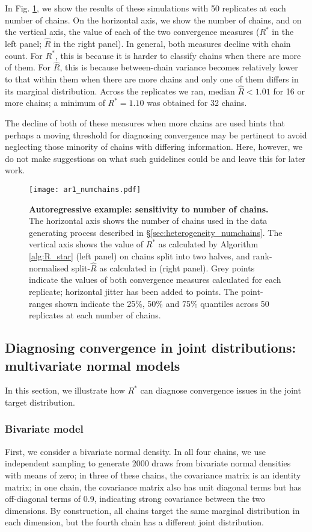 \documentclass{article}
\begin{document}
In Fig. \ref{fig:ar1_numchains}, we show the results of these simulations with 50 replicates at each number of chains. On the horizontal axis, we show the number of chains, and on the vertical axis, the value of each of the two convergence measures ($R^*$ in the left panel; $\widehat{R}$ in the right panel). In general, both measures decline with chain count. For $R^*$, this is because it is harder to classify chains when there are more of them. For $\widehat{R}$, this is because between-chain variance becomes relatively lower to that within them when there are more chains and only one of them differs in its marginal distribution. Across the replicates we ran, median $\widehat{R}<1.01$ for 16 or more chains; a minimum of $R^*=1.10$ was obtained for 32 chains.

The decline of both of these measures when more chains are used hints that perhaps a moving threshold for diagnosing convergence may be pertinent to avoid neglecting those minority of chains with differing information. Here, however, we do not make suggestions on what such guidelines could be and leave this for later work.

\begin{figure}[!htb]
	\centerline{\texttt{[image: ar1\_numchains.pdf]}}
	\caption{\textbf{Autoregressive example: sensitivity to number of chains.} The horizontal axis shows the number of chains used in the data generating process described in \S\ref{sec:heterogeneity_numchains}. The vertical axis shows the value of $R^*$ as calculated by Algorithm \ref{alg:R_star} (left panel) on chains split into two halves, and rank-normalised split-$\widehat{R}$ as calculated in \cite{vehtari2019rank} (right panel). Grey points indicate the values of both convergence measures calculated for each replicate; horizontal jitter has been added to points. The point-ranges shown indicate the 25\%, 50\% and 75\% quantiles across 50 replicates at each number of chains.}
	\label{fig:ar1_numchains}
\end{figure}

\subsection{Diagnosing convergence in joint distributions: multivariate normal models}\label{sec:multivariate_normal}
In this section, we illustrate how $R^*$ can diagnose convergence issues in the joint target distribution.

\subsubsection{Bivariate model}\label{sec:multivariate_normal_bivariate}
First, we consider a bivariate normal density. In all four chains, we use independent sampling to generate 2000 draws from bivariate normal densities with means of zero; in three of these chains, the covariance matrix is an identity matrix; in one chain, the covariance matrix also has unit diagonal terms but has off-diagonal terms of 0.9, indicating strong covariance between the two dimensions. By construction, all chains target the same marginal distribution in each dimension, but the fourth chain has a different joint distribution.
\end{document}
